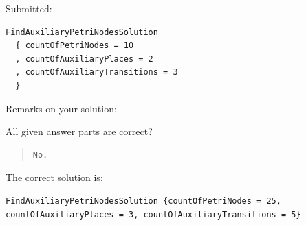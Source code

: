 Submitted:


\begin{verbatim}
FindAuxiliaryPetriNodesSolution 
  { countOfPetriNodes = 10
  , countOfAuxiliaryPlaces = 2
  , countOfAuxiliaryTransitions = 3 
  }
\end{verbatim}


Remarks on your solution:

All given answer parts are correct?

\begin{quote}
\begin{verbatim}
No.
\end{verbatim}
\end{quote}

The correct solution is:
\begin{verbatim}
FindAuxiliaryPetriNodesSolution {countOfPetriNodes = 25, countOfAuxiliaryPlaces = 3, countOfAuxiliaryTransitions = 5}
\end{verbatim}


